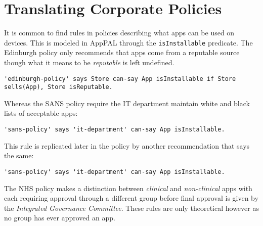 \documentclass{easychair}
\begin{document}

\section{Translating Corporate Policies}
\label{sec:translation}

It is common to find rules in policies describing what apps can be used on devices.
This is modeled in AppPAL through the \texttt{isInstallable} predicate.
The Edinburgh policy only recommends that apps come from a reputable source though what it means to be \emph{reputable} is left undefined. 
\begin{lstlisting}[title={\footnotesize\textbf{Edinburgh}:~\itshape ``Only download applications (‘apps’) or other software from reputable sources.''}]
'edinburgh-policy' says Store can-say App isInstallable if Store sells(App), Store isReputable.
\end{lstlisting}
Whereas the SANS policy require the IT department maintain white and black lists of acceptable apps:
\begin{lstlisting}[title={\footnotesize\textbf{SANS}:~\itshape ``The IT Department maintains a list of allowed and unauthorzed applications and makes them available to users on the intranet.''}]
'sans-policy' says 'it-department' can-say App isInstallable.
\end{lstlisting}
This rule is replicated later in the policy by another recommendation that says the same:
\begin{lstlisting}[title={\footnotesize\textbf{SANS}:~\itshape ``Only approved third party applications can be
installed on handhelds. The approved list can be
obtained by contacting the IT department, or should be
available on the intranet.''}]
'sans-policy' says 'it-department' can-say App isInstallable.
\end{lstlisting}
The NHS policy makes a distinction between \emph{clinical} and \emph{non-clinical} apps with each requiring approval through a different group before final approval is given by the \emph{Integrated Governance Committee}.  These rules are only theoretical however as no group has ever approved an app.
\end{document}
